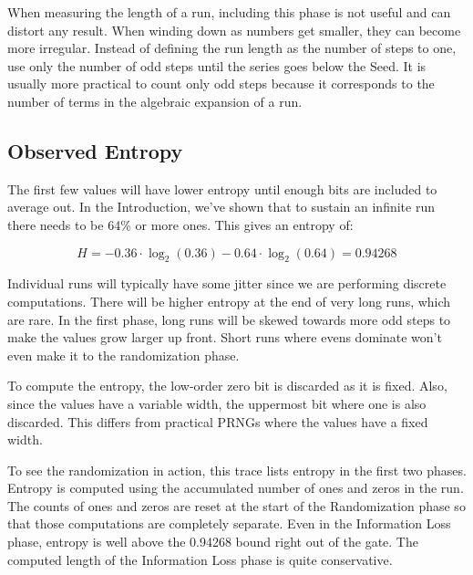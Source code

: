 \documentclass[letterpaper]{article}
\begin{document}
\begin{multicols}{2}
    When measuring the length of a run, including this phase is not useful and can distort any result. When winding down as numbers get smaller, they can become more irregular. Instead of defining the run length as the number of steps to one, use only the number of odd steps until the series goes below the Seed. It is usually more practical to count only odd steps because it corresponds to the number of terms in the algebraic expansion of a run.

    \subsection{Observed Entropy}

    The first few values will have lower entropy until enough bits are included to average out. In the Introduction, we've shown that to sustain an infinite run there needs to be 64\% or more ones. This gives an entropy of:

    \[ H = -0.36 \cdot \log_2(0.36) - 0.64 \cdot \log_2(0.64) = 0.94268 \]

    Individual runs will typically have some jitter since we are performing discrete computations. There will be higher entropy at the end of very long runs, which are rare. In the first phase, long runs will be skewed towards more odd steps to make the values grow larger up front. Short runs where evens dominate won't even make it to the randomization phase.

    To compute the entropy, the low-order zero bit is discarded as it is fixed. Also, since the values have a variable width, the uppermost bit where one is also discarded. This differs from practical PRNGs where the values have a fixed width.

    To see the randomization in action, this trace lists entropy in the first two phases. Entropy is computed using the accumulated number of ones and zeros in the run. The counts of ones and zeros are reset at the start of the Randomization phase so that those computations are completely separate. Even in the Information Loss phase, entropy is well above the 0.94268 bound right out of the gate. The computed length of the Information Loss phase is quite conservative.


\end{multicols}
\end{document}
